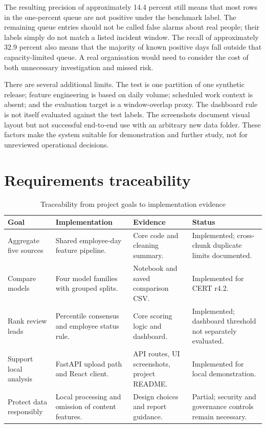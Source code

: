 \documentclass[12pt,a4paper,oneside]{report}
\newcommand{\tablefont}{\small}
\begin{document}
The resulting precision of approximately 14.4 percent still means
that most rows in the one-percent queue are not positive under the
benchmark label. The remaining queue entries should not be called
false alarms about real people; their labels simply do not match a
listed incident window. The recall of approximately 32.9 percent also
means that the majority of known positive days fall outside that
capacity-limited queue. A real organisation would need to consider the
cost of both unnecessary investigation and missed risk.

There are several additional limits. The test is one partition of one
synthetic release; feature engineering is based on daily volume;
scheduled work context is absent; and the evaluation target is a
window-overlap proxy. The dashboard rule is not itself evaluated
against the test labels. The screenshots document visual layout but
not successful end-to-end use with an arbitrary new data folder.
These factors make the system suitable for demonstration and further
study, not for unreviewed operational decisions.

\section{Requirements traceability}
\begin{table}[H]
\centering
\tablefont
\caption{Traceability from project goals to implementation evidence}
\label{tab:traceability}
\begin{tabularx}{\textwidth}{|p{}|p{}|p{}|Y|}
\hline
\textbf{Goal} & \textbf{Implementation} & \textbf{Evidence} & \textbf{Status}\\\hline
Aggregate five sources & Shared employee-day feature pipeline. & Core code and cleaning summary. & Implemented; cross-chunk duplicate limits documented.\\\hline
Compare models & Four model families with grouped splits. & Notebook and saved comparison CSV. & Implemented for CERT r4.2.\\\hline
Rank review leads & Percentile consensus and employee status rule. & Core scoring logic and dashboard. & Implemented; dashboard threshold not separately evaluated.\\\hline
Support local analysis & FastAPI upload path and React client. & API routes, UI screenshots, project README. & Implemented for local demonstration.\\\hline
Protect data responsibly & Local processing and omission of content features. & Design choices and report guidance. & Partial; security and governance controls remain necessary.\\\hline
\end{tabularx}
\end{table}
\end{document}
